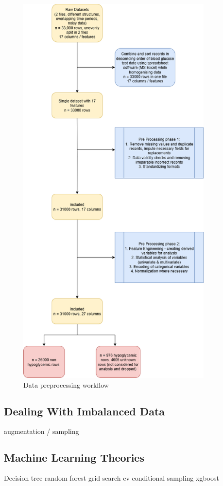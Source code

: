 	\begin{figure}[H]
		\centering
		\includegraphics[height=8in]{figures/dataPreprocessingWf.png}
		\caption{Data preprocessing workflow}
		\label{fig:datapreprocessingwf}
	\end{figure}

	\subsection{Dealing With Imbalanced Data}
	augmentation / sampling

	\subsection{Machine Learning Theories}
	Decision tree
	random forest 
	grid search cv 
	conditional sampling 
	xgboost

